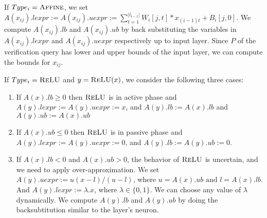\begin{itemize}
\item If $Type_i= \textsc{Affine}$, we set 
  $A(x_{ij}).lexpr := A(x_{ij}).uexpr := \sum_{t=1}^{|l_{i-1}|} W_i[j,t]*x_{(i-1)t} + B_i[j,0]$.
  We compute $A(x_{ij}).lb$ and $A(x_{ij}).ub$ by back substituting
  the variables in $A(x_{ij}).lexpr$ and $A(x_{ij}).uexpr$ respectively up to input layer.
  Since $P$ of the verification query has lower and upper bounds of the input layer,
  we can compute the bounds for $x_{ij}$.
{\color{red}
\item If $Type_i= \textsc{ReLU}$ and $y=\textsc{ReLU}(x)$, we consider the following three cases:
  \begin{enumerate}
  \item If $A(x).lb \geq 0$ then $\textsc{ReLU}$ is in active phase and
    $A(y).lexpr := A(y).uexpr := x$,
    and $A(y).lb := A(x).lb$ and $A(y).ub := A(x).ub$
  \item If $A(x).ub \leq 0$ then $\textsc{ReLU}$ is in passive phase and
    $A(y).lexpr := A(y).uexpr := 0$, 
    and $A(y).lb := A(y).ub := 0$.
  \item  If $A(x).lb < 0$ and $A(x).ub > 0$,
    the behavior of $\textsc{ReLU}$ is uncertain, and we need to apply
    over-approximation. We set $A(y).uexpr := u(x - l) / (u - l)$, 
    where $u = A(x).ub \text{ and } l = A(x).lb$.
    And $A(y).lexpr := \lambda . x$, where $\lambda \in \{0,1\}$. 
    We can choose any value of $\lambda$ dynamically.
    We compute $A(y).lb$ and $A(y).ub$ by doing the backsubtitution similar to the \affine{} layer's neuron.
  \end{enumerate}
} 



\end{itemize}

